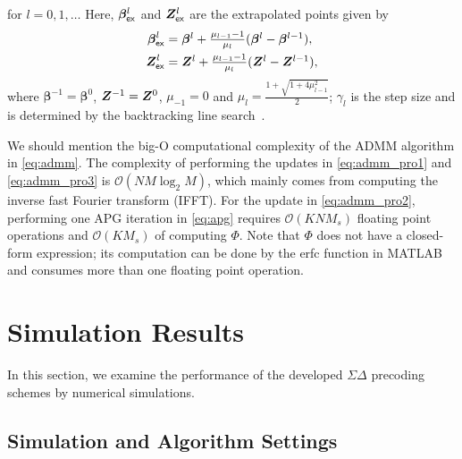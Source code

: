 \documentclass[10pt,twocolumn,twoside]{IEEEtran}
\begin{document}
for $l = 0,1,\dots$
Here, $\bm \beta_{\sf ex}^l$ and ${\bm Z}_{\sf ex}^l$ are the extrapolated points given by
\begin{align*}
\bm \beta_{\sf ex}^l &=  \textstyle {\bm \beta}^{l} + \frac{\mu_{l-1}-1}{\mu_l} ( \bm \beta^{l} - \bm \beta^{l-1}),\\
{\bm Z}_{\sf ex}^l &=  \textstyle {\ensuremath{{\bm Z}}}^{l} + \frac{\mu_{l-1}-1}{\mu_l} ( {\bm Z}^{l} - {\bm Z}^{l-1}),
\end{align*}
where
$\bm \beta^{-1} = \bm \beta^{0}$, ${\bm Z}^{-1} = {\bm Z}^0$, $\mu_{-1} = 0$ and $\mu_{l} = \frac{1+\sqrt{1+4\mu_{l-1}^2}}{2}$;
$\gamma_l$ is the step size and is determined by the backtracking line search~\cite{beck2017first}.




We should mention the big-O computational complexity of the ADMM algorithm in \eqref{eq:admm}.
The complexity of performing the updates in \eqref{eq:admm_pro1} and \eqref{eq:admm_pro3} is $\mathcal{O}(NM \log_2 M)$, which mainly comes from computing
the inverse fast Fourier transform (IFFT).
For the update in \eqref{eq:admm_pro2}, performing one APG iteration in \eqref{eq:apg} requires $\mathcal{O}(KNM_s)$ floating point operations and $\mathcal{O}(KM_s)$ of computing $\Phi$.
Note that $\Phi$ does not have a closed-form expression; its computation can be done by the {\sf erfc} function in MATLAB and consumes more than one floating point operation.







\section{Simulation Results}
\label{sec:simulation}

In this section, we examine the performance of the developed $\Sigma \Delta$ precoding schemes by numerical simulations.


\subsection{Simulation and Algorithm Settings}
\end{document}
